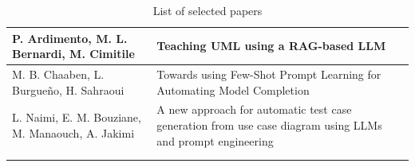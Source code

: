\begin{longtable}{p{5cm} p{7.5cm} p{2.5cm}}
    \midrule
    P. Ardimento, M. L. Bernardi, M. Cimitile & Teaching UML using a RAG-based LLM & \cite{13benardi2024} \\ 
    \midrule
    M. B. Chaaben, L. Burgueño, H. Sahraoui & Towards using Few-Shot Prompt Learning for Automating Model Completion & \cite{14chaaben2023}\\ 
    \midrule
    L. Naimi, E. M. Bouziane, M. Manaouch, A. Jakimi & A new approach for automatic test case generation from use case diagram using LLMs and prompt engineering & \cite{15Naimi} \\  
    \bottomrule
    \\
    \caption{List of selected papers} \label{tab:papers} 
\end{longtable}
